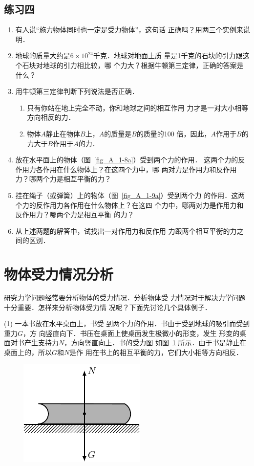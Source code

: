 \subsection*{练习四} 
\begin{enumerate} 
\item  有人说“施力物体同时也一定是受力物体”，这句话
正确吗？用两三个实例来说明．

\item  地球的质量大约是$6\times 10^{24} $千克．地球对地面上质
量是1千克的石块的引力跟这个石块对地球的引力相比较，哪
个力大？根据牛顿第三定律，正确的答案是什么？

\item  用牛顿第三定律判断下列说法是否正确．
\begin{enumerate} 
\item  只有你站在地上完全不动，你和地球之间的相互作用
力才是一对大小相等方向相反的力．
\item  物体$A$静止在物体$B$上，$A$的质量是$B$的质量的100
倍，因此，$A$作用于$B$的力大于$B$作用于$A$的力．
\end{enumerate} 

\item  放在水平面上的物体（图~\ref{fig_A_1-8a}）受到两个力的作用．
这两个力的反作用力各作用在什么物体上？在这四个力中，哪
两对力是作用力和反作用力？哪两个力是相互平衡的力？
\item  挂在绳子（或弹簧）上的物体（图~\ref{fig_A_1-9a}）受到两个力
的作用．这两个力的反作用力各作用在什么物体上？在这四
个力中，哪两对力是作用力和反作用力？哪两个力是相互平衡
的力？
\item 从上述两题的解答中，试找出一对作用力和反作用
力跟两个相互平衡的力之间的区别．

\end{enumerate} 

\section{物体受力情况分析} 
    研究力学问题经常要分析物体的受力情况．分析物体受
力情况对于解决力学问题十分重要．怎样来分析物体受力情
况呢？下面先讨论几个具体例子．

    (1)   一本书放在水平桌面上，书受
到两个力的作用．书由于受到地球的吸引而受到重力$G$，方
向竖直向下．书压在桌面上使桌面发生极微小的形变，发生
形变的桌面对书产生支持力$N$，方向竖直向上．书的受力图
如图~\ref{fig_A_1-16} 所示．由于书是静止在桌面上的，所以$G$和$N$是作
用在书上的相互平衡的力，它们大小相等方向相反．
\begin{figure}[htbp]
    \centering
    \includegraphics{fig/A/1-16.pdf} 
    \caption{} \label{fig_A_1-16} 
\end{figure} 

